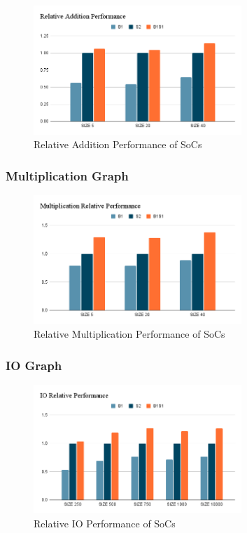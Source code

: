 \begin{figure}[H]
    \centering
    \includegraphics[width=0.7\textwidth]{img/Relative Addition Performance.png}
    \caption{Relative Addition Performance of SoCs}
    \label{fig:add_relative_graph}
\end{figure}

\subsubsection{Multiplication Graph}

\begin{figure}[H]
    \centering
    \includegraphics[width=0.7\textwidth]{img/Multiplication Relative Performance.png}
    \caption{Relative Multiplication Performance of SoCs}
    \label{fig:mul_relative_graph}
\end{figure}

\subsubsection{IO Graph}

\begin{figure}[H]
    \centering
    \includegraphics[width=0.7\textwidth]{img/IO Relative Performance.png}
    \caption{Relative IO Performance of SoCs}
    \label{fig:IO_relative_graph}
\end{figure}

